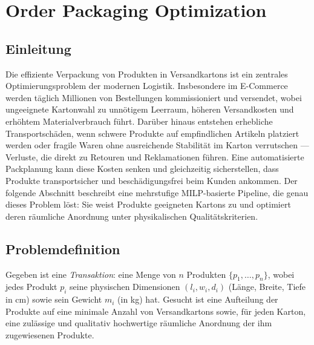 \documentclass[10pt]{article}
\begin{document}
\section{Order Packaging Optimization}

\subsection{Einleitung}
\label{sec:einleitung}

Die effiziente Verpackung von Produkten in Versandkartons ist ein
zentrales Optimierungsproblem der modernen Logistik.
Insbesondere im E-Commerce werden t\"aglich Millionen von Bestellungen kommissioniert und versendet,
wobei ungeeignete Kartonwahl zu unn\"otigem Leerraum, h\"oheren
Versandkosten und erh\"ohtem Materialverbrauch f\"uhrt.
Dar\"uber hinaus entstehen erhebliche Transportsch\"aden, wenn schwere
Produkte auf empfindlichen Artikeln platziert werden oder fragile Waren
ohne ausreichende Stabilit\"at im Karton verrutschen --- Verluste, die
direkt zu Retouren und Reklamationen f\"uhren.
Eine automatisierte Packplanung kann diese Kosten
senken und gleichzeitig sicherstellen, dass Produkte
transportsicher und besch\"adigungsfrei beim Kunden ankommen.
Der folgende Abschnitt beschreibt eine mehrstufige MILP-basierte Pipeline,
die genau dieses Problem l\"ost: Sie weist Produkte geeigneten Kartons zu
und optimiert deren r\"aumliche Anordnung unter physikalischen
Qualit\"atskriterien.

\subsection{Problemdefinition}
\label{sec:problem}

Gegeben ist eine \emph{Transaktion}: eine Menge von $n$ Produkten
$\{p_1, \dots, p_n\}$, wobei jedes Produkt $p_i$ seine physischen
Dimensionen $(l_i, w_i, d_i)$ (L\"ange, Breite, Tiefe in cm) sowie sein
Gewicht $m_i$ (in kg) hat.
Gesucht ist eine Aufteilung der Produkte auf eine minimale Anzahl von
Versandkartons sowie, f\"ur jeden Karton, eine zul\"assige und qualitativ
hochwertige r\"aumliche Anordnung der ihm zugewiesenen Produkte.
\end{document}
